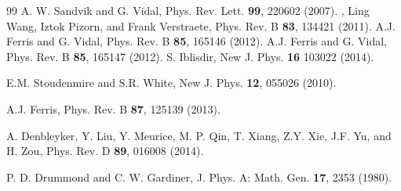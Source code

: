 \documentclass[aps,prl,nopacs,twocolumn]{revtex4}
\begin{document}
\begin{thebibliography}{99}
A. W. Sandvik and G. Vidal, %
Phys. Rev. Lett. {\bf 99}, 220602 (2007).
, %
Ling Wang, Iztok Pizorn, and Frank Verstraete,
Phys. Rev. B {\bf 83}, 134421 (2011).
A.J. Ferris and G. Vidal, %
Phys. Rev. B {\bf 85}, 165146 (2012).
A.J. Ferris and G. Vidal, %
Phys. Rev. B {\bf 85}, 165147 (2012).
S. Iblisdir, %
New J. Phys. {\bf 16} 103022 (2014).

E.M. Stoudenmire and S.R. White, %
New J. Phys. {\bf 12}, 055026 (2010).

A.J. Ferris, %
Phys. Rev. B {\bf 87}, 125139 (2013).

A. Denbleyker, Y. Liu, Y. Meurice, M. P. Qin, T. Xiang, Z.Y. Xie, J.F. Yu, and H. Zou, %
Phys. Rev. D {\bf 89}, 016008 (2014).

P. D. Drummond and C. W. Gardiner, %
J. Phys. A: Math. Gen. {\bf 17}, 2353 (1980).

\end{thebibliography}
\end{document}
